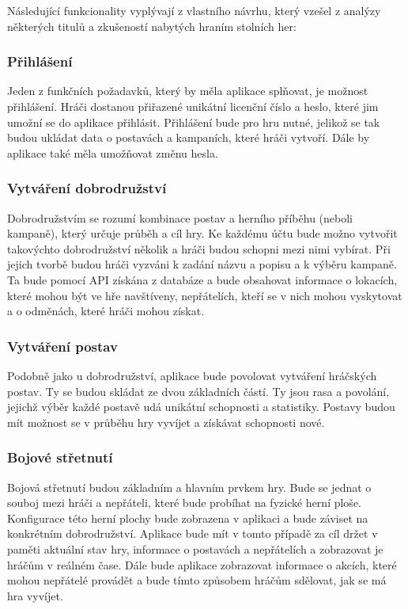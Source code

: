 Následující funkcionality vyplývají z vlastního návrhu, který vzešel z analýzy některých titulů a zkušeností nabytých hraním stolních her:

\subsubsection*{Přihlášení}
Jeden z funkčních požadavků, který by měla aplikace splňovat, je možnost přihlášení. Hráči dostanou přiřazené unikátní licenční číslo a heslo, které jim umožní se do aplikace přihlásit. Přihlášení bude pro hru nutné, jelikož se tak budou ukládat data o postavách a kampaních, které hráči vytvoří. Dále by aplikace také měla umožňovat změnu hesla.

\subsubsection*{Vytváření dobrodružství}
Dobrodružstvím se rozumí kombinace postav a herního příběhu (neboli kampaně), který určuje průběh a cíl hry. Ke každému účtu bude možno vytvořit takovýchto dobrodružství několik a hráči budou schopni mezi nimi vybírat. Při jejich tvorbě budou hráči vyzváni k zadání názvu a popisu a k výběru kampaně. Ta bude pomocí API získána z databáze a bude obsahovat informace o lokacích, které mohou být ve hře navštíveny, nepřátelích, kteří se v nich mohou vyskytovat a o odměnách, které hráči mohou získat.

\subsubsection*{Vytváření postav}
Podobně jako u dobrodružství, aplikace bude povolovat vytváření hráčských postav. Ty se budou skládat ze dvou základních částí. Ty jsou rasa a povolání, jejichž výběr každé postavě udá unikátní schopnosti a statistiky. Postavy budou mít možnost se v průběhu hry vyvíjet a získávat schopnosti nové.

\subsubsection*{Bojové střetnutí}
Bojová střetnutí budou základním a hlavním prvkem hry. Bude se jednat o souboj mezi hráči a nepřáteli, které bude probíhat na fyzické herní ploše. Konfigurace této herní plochy bude zobrazena v aplikaci a bude záviset na konkrétním dobrodružství. Aplikace bude mít v tomto případě za cíl držet v paměti aktuální stav hry, informace o postavách a nepřátelích a zobrazovat je hráčům v reálném čase. Dále bude aplikace zobrazovat informace o akcích, které mohou nepřátelé provádět a bude tímto způsobem hráčům sdělovat, jak se má hra vyvíjet.
\pagebreak

